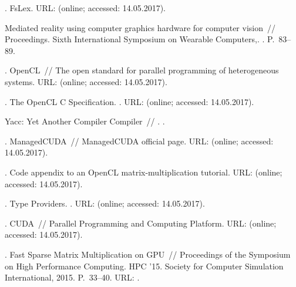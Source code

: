\begin{thebibliography}{10}
. FsLex. \BibDash
\newblock URL: 
  (online; accessed: 14.05.2017).

 Mediated reality using computer graphics
  hardware for computer vision~// Proceedings. Sixth International Symposium on
  Wearable Computers,. \BibDash
{}. \BibDash
\newblock P.~83--89.

. OpenCL~// The open standard for parallel programming
  of heterogeneous systems. \BibDash
\newblock URL:  (online; accessed:
  14.05.2017).

. The OpenCL C Specification. \BibDash
{}. \BibDash
\newblock URL:
  (online; accessed: 14.05.2017).

 Yacc: Yet Another Compiler Compiler~//
  . \BibDash
{}.

. ManagedCUDA~// ManagedCUDA official page. \BibDash
\newblock URL:  (online;
  accessed: 14.05.2017).

. Code appendix to an OpenCL matrix-multiplication tutorial.
  \BibDash
\newblock URL:  (online; accessed:
  14.05.2017).

. Type Providers. \BibDash
{}. \BibDash
\newblock URL:
  (online; accessed: 14.05.2017).

. CUDA~// Parallel Programming and Computing Platform. \BibDash
\newblock URL: 
  (online; accessed: 14.05.2017).

. Fast Sparse Matrix
  Multiplication on GPU~// Proceedings of the Symposium on High Performance
  Computing. \BibDash
\newblock HPC '15. \BibDash
\newblock Society for Computer Simulation International, 2015. \BibDash
\newblock P.~33--40. \BibDash
\newblock URL: .


\end{thebibliography}
